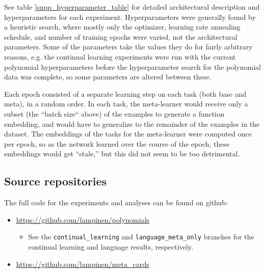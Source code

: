 \documentclass{article}
\begin{document}
See table \ref{supp_hyperparameter_table} for detailed architectural description and hyperparameters for each experiment. Hyperparameters were generally found by a heuristic search, where mostly only the optimizer, learning rate annealing schedule, and number of training epochs were varied, not the architectural parameters. Some of the parameters take the values they do for fairly arbitrary reasons, e.g. the continual learning experiments were run with the current polynomial hyperparameters before the hyperparameter search for the polynomial data was complete, so some parameters are altered between these. \par
Each epoch consisted of a separate learning step on each task (both base and meta), in a random order. In each task, the meta-learner would receive only a subset (the ``batch size`` above) of the examples to generate a function embedding, and would have to generalize to the remainder of the examples in the dataset. The embeddings of the tasks for the meta-learner were computed once per epoch, so as the network learned over the course of the epoch, these embeddings would get ``stale,'' but this did not seem to be too detrimental. \par 

\subsection{Source repositories}
The full code for the experiments and analyses can be found on github:
\begin{itemize}
\item \url{https://github.com/lampinen/polynomials}
    \begin{itemize}
        \item See the \verb|continual_learning| and \verb|language_meta_only| branches for the continual learning and language results, respectively. 
    \end{itemize}
\item \url{https://github.com/lampinen/meta_cards} 
\end{itemize}
\end{document}
